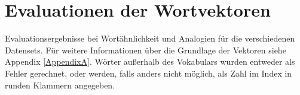 
\chapter{Evaluationen der Wortvektoren} %

\label{AppendixB} %

Evaluationsergebnisse bei Wortähnlichkeit und Analogien für die verschiedenen Datensets.
Für weitere Informationen über die Grundlage der Vektoren siehe Appendix \ref{AppendixA}.
Wörter außerhalb des Vokabulars wurden entweder als Fehler gerechnet, oder
werden, falls anders nicht möglich, als Zahl im Index in runden Klammern angegeben.

\vspace{1cm}

